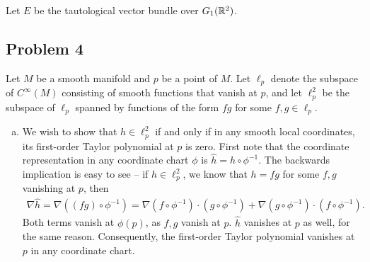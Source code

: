 \documentclass{../../mathnotes}
\begin{document}
Let $E$ be the tautological vector bundle over $G_1(\mathbb{R}^2)$.

\subsection*{Problem 4}

Let $M$ be a smooth manifold and $p$ be a point of $M$. Let $\ell_p$ denote the subspace of $C^\infty(M)$ consisting of smooth functions
that vanish at $p$, and let $\ell_p^2$ be the subspace of $\ell_p$ spanned by functions of the form $fg$ for some $f,g\in\ell_p$.
\begin{enumerate}[(a)]
    \item We wish to show that $h\in\ell^2_p$ if and only if in any smooth local coordinates, its first-order Taylor
        polynomial at $p$ is zero. First note that the coordinate representation in any coordinate chart $\phi$ is $\hat h=h\circ\phi^{-1}$.
        The backwards implication is easy to see -- if $h\in\ell^2_p$, we know that $h=fg$ for some $f,g$ vanishing at $p$, then
        \begin{align*}
            \nabla\hat h=\nabla\left( (fg)\circ\phi^{-1} \right)=\nabla(f\circ\phi^{-1})\cdot (g\circ\phi^{-1})+\nabla(g\circ\phi^{-1})\cdot (f\circ\phi^{-1}).
        \end{align*}
        Both terms vanish at $\phi(p)$, as $f,g$ vanish at $p$. $\hat h$ vanishes at $p$ as well, for the same reason.
        Consequently, the first-order Taylor polynomial vanishes at $p$ in any coordinate chart.


\end{enumerate}
\end{document}
